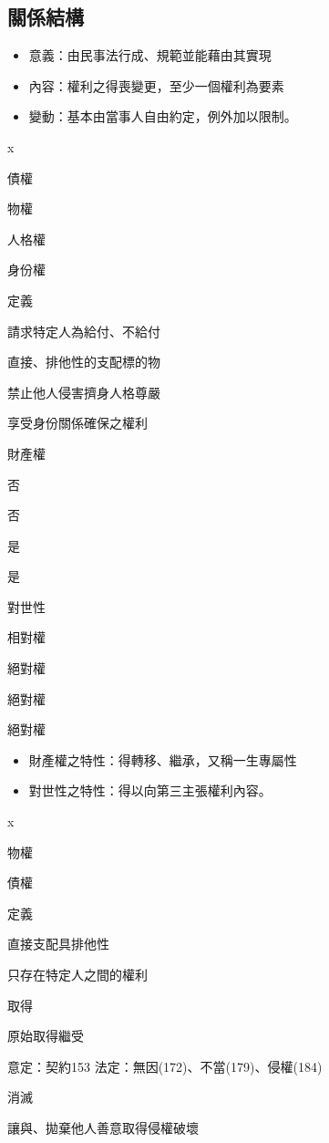 \documentclass[
]{book}
\begin{document}
\hypertarget{ux95dcux4fc2ux7d50ux69cb}{%
\subsection{關係結構}\label{ux95dcux4fc2ux7d50ux69cb}}

\begin{itemize}
\item
  意義：由民事法行成、規範並能藉由其實現
\item
  內容：權利之得喪變更，至少一個權利為要素
\item
  變動：基本由當事人自由約定，例外加以限制。
\end{itemize}

x

債權

物權

人格權

身份權

定義

請求特定人為給付、不給付

直接、排他性的支配標的物

禁止他人侵害擠身人格尊嚴

享受身份關係確保之權利

財產權

否

否

是

是

對世性

相對權

絕對權

絕對權

絕對權

\begin{itemize}
\item
  財產權之特性：得轉移、繼承，又稱一生專屬性
\item
  對世性之特性：得以向第三主張權利內容。
\end{itemize}

x

物權

債權

定義

直接支配具排他性

只存在特定人之間的權利

取得

原始取得繼受

意定：契約153
法定：無因(172)、不當(179)、侵權(184)

消滅

讓與、拋棄他人善意取得侵權破壞
\end{document}
